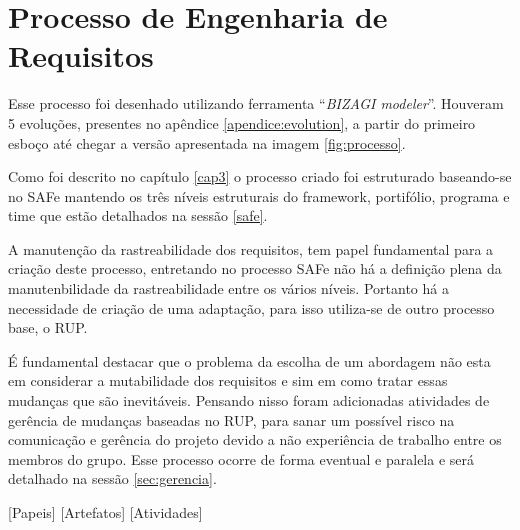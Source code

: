 \chapter[Processo de Engenharia de Requisitos]{Processo de Engenharia de Requisitos}\label{cap4}

Esse processo foi desenhado utilizando ferramenta ``\textit{BIZAGI modeler}''. Houveram 5 evoluções,
presentes no apêndice \ref{apendice:evolution}, a partir do primeiro esboço até chegar a versão apresentada na imagem \ref{fig:processo}.

Como foi descrito no capítulo \ref{cap3} o processo criado foi estruturado baseando-se no
SAFe mantendo os três níveis estruturais do framework, portifólio, programa e time
que estão detalhados na sessão \ref{safe}.

A manutenção da rastreabilidade dos requisitos, tem papel fundamental para a criação deste processo,
entretando no processo SAFe não há a definição plena da manutenbilidade da rastreabilidade entre os
vários níveis. Portanto há a necessidade de criação de uma adaptação, para isso utiliza-se de
outro processo base, o RUP.

É fundamental destacar que o problema da escolha de um abordagem não esta em considerar
a mutabilidade dos requisitos e sim em como tratar essas mudanças que são inevitáveis.
Pensando nisso foram adicionadas atividades de gerência de mudanças baseadas no RUP,
para sanar um possível risco na comunicação e gerência do projeto devido a não experiência
de trabalho entre os membros do grupo. Esse processo ocorre de forma eventual e paralela
e será detalhado na sessão \ref{sec:gerencia}.



[Papeis]
[Artefatos]
[Atividades]


